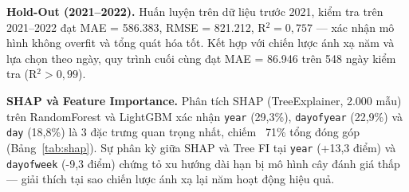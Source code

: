 \documentclass{article}
\begin{document}

\textbf{Hold-Out (2021--2022).} Huấn luyện trên dữ liệu trước 2021, kiểm tra trên 2021--2022 đạt MAE = 586.383, RMSE = 821.212, R$^2 = 0{,}757$ — xác nhận mô hình không overfit và tổng quát hóa tốt. Kết hợp với chiến lược ánh xạ năm và lựa chọn theo ngày, quy trình cuối cùng đạt MAE = 86.946 trên 548 ngày kiểm tra (R$^2 > 0{,}99$).

\textbf{SHAP và Feature Importance.} Phân tích SHAP (TreeExplainer, 2.000 mẫu) trên RandomForest và LightGBM xác nhận \texttt{year} (29,3\%), \texttt{dayofyear} (22,9\%) và \texttt{day} (18,8\%) là 3 đặc trưng quan trọng nhất, chiếm ~71\% tổng đóng góp (Bảng~\ref{tab:shap}). Sự phân kỳ giữa SHAP và Tree FI tại \texttt{year} (+13,3 điểm) và \texttt{dayofweek} (-9,3 điểm) chứng tỏ xu hướng dài hạn bị mô hình cây đánh giá thấp — giải thích tại sao chiến lược ánh xạ lại năm hoạt động hiệu quả. 


\end{document}
